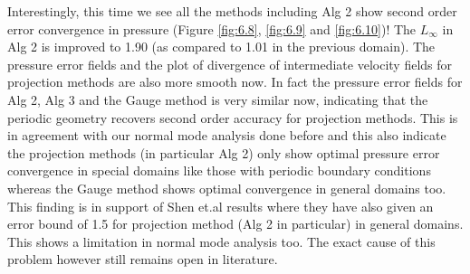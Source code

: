Interestingly, this time we see all the methods including Alg 2 show second order error convergence in pressure (Figure \ref{fig:6.8}, \ref{fig:6.9} and \ref{fig:6.10})! The $L_\infty$ in Alg 2 is improved to 1.90 (as compared to 1.01 in the previous domain). The pressure error fields and the plot of divergence of intermediate velocity fields for projection methods are also more smooth now. In fact the pressure error fields for Alg 2, Alg 3 and the Gauge method is very similar now, indicating that the periodic geometry recovers second order accuracy for projection methods. This is in agreement with our normal mode analysis done before and this also indicate the projection methods (in particular Alg 2) only show optimal pressure error convergence in special domains like those with periodic boundary conditions whereas the Gauge method shows optimal convergence in general domains too. This finding is in support of Shen et.al results \cite{guermond2004error, guermond2006overview} where they have also given an error bound of 1.5 for projection method (Alg 2 in particular) in general domains. This shows a limitation in normal mode analysis too. The exact cause of this problem however still remains open in literature.\\
\newpage
